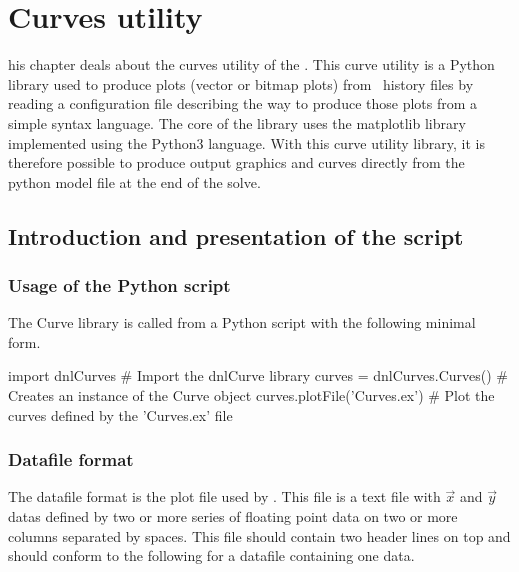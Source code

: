 %
%
%
\chapter{Curves utility}\label{chap:CU!CU}

\startcontents[chapters]
\printmyminitoc[1]

his chapter deals about the curves utility of the \DynELA. This curve utility is a Python library used to produce plots (vector or bitmap plots) from \DynELA~history files by reading a configuration file describing the way to produce those plots from a simple syntax language. The core of the library uses the matplotlib library implemented using the Python3 language. With this curve utility library, it is therefore possible to produce output graphics and curves directly from the python model file at the end of the solve.

\section{Introduction and presentation of the script}

\subsection{Usage of the Python script}

The Curve library is called from a Python script with the following minimal form.

\begin{PythonListing}
import dnlCurves              # Import the dnlCurve library
curves = dnlCurves.Curves()   # Creates an instance of the Curve object
curves.plotFile('Curves.ex')  # Plot the curves defined by the 'Curves.ex' file
\end{PythonListing}

\subsection{Datafile format}

The datafile format is the plot file used by \DynELA. This file is a text file with $\overrightarrow{x}$ and $\overrightarrow{y}$ datas defined by two or more series of floating point data on two or more columns separated by spaces. This file should contain two header lines on top and should conform to the following for a datafile containing one data.

